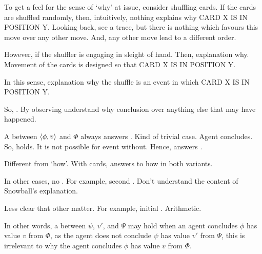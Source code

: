 \begin{note}
  To get a feel for the sense of `why' at issue, consider shuffling cards.
  If the cards are shuffled randomly, then, intuitively, nothing explains why CARD X IS IN POSITION Y.
  Looking back, see a trace, but there is nothing which favours this move over any other move.
  And, any other move lead to a different order.

  However, if the shuffler is engaging in sleight of hand.
  Then, explanation why.
  Movement of the cards is designed so that CARD X IS IN POSITION Y.

  In this sense, explanation why the shuffle is an event in which CARD X IS IN POSITION Y.
\end{note}

\begin{note}
  So, \qWhy{}.
  By observing  understand why conclusion over anything else that may have happened.

  A \ros{} between \(\langle \phi, v \rangle\) and \(\Phi\) always answers \qWhy{}.
  Kind of trivial case.
  Agent concludes.
  So, \ros{} holds.
  It is not possible for event without.
  Hence, answers \qWhy{}.
\end{note}

\begin{note}
  Different from `how'.
  With cards, answers to how in both variants.
\end{note}

\begin{note}
  In other cases, no \ros{}.
  For example, second \scen{}.
  Don't understand the content of Snowball's explanation.

  Less clear that other \ros{} matter.
  For example, initial \scen{}.
  Arithmetic.

  In other words, a \ros{} between \(\psi\), \(v'\), and \(\Psi\) may hold when an agent concludes \(\phi\) has value \(v\) from \(\Phi\), as the agent does not conclude \(\psi\) has value \(v'\) from \(\Psi\), this \ros{} is irrelevant to why the agent concludes \(\phi\) has value \(v\) from \(\Phi\).
\end{note}




